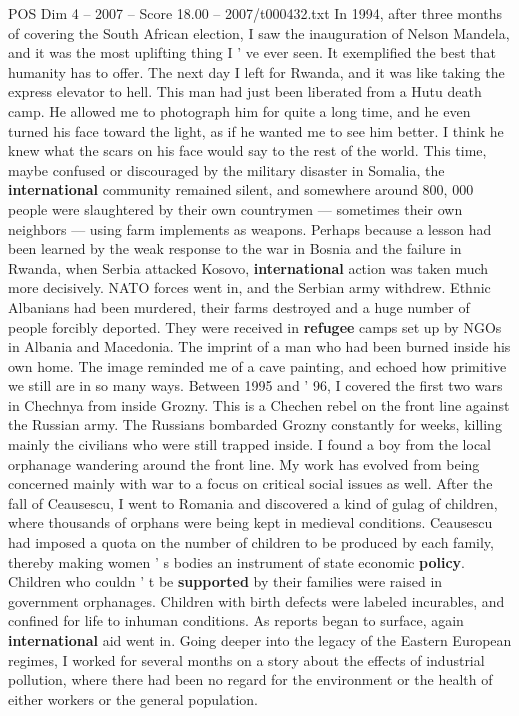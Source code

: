 \begin{textsample}{POS Dim 4 – 2007 – Score 18.00 – 2007/t000432.txt}
In 1994, after three months of covering the South African election, I saw the inauguration of Nelson Mandela, and it was the most uplifting thing I ' ve ever seen.
It exemplified the best that humanity has to offer.
The next day I left for Rwanda, and it was like taking the express elevator to hell.
This man had just been liberated from a Hutu death camp.
He allowed me to photograph him for quite a long time, and he even turned his face toward the light, as if he wanted me to see him better.
I think he knew what the scars on his face would say to the rest of the world.
This time, maybe confused or discouraged by the military disaster in Somalia, the \textbf{international} community remained silent, and somewhere around 800, 000 people were slaughtered by their own countrymen — sometimes their own neighbors — using farm implements as weapons.
Perhaps because a lesson had been learned by the weak response to the war in Bosnia and the failure in Rwanda, when Serbia attacked Kosovo, \textbf{international} action was taken much more decisively.
NATO forces went in, and the Serbian army withdrew.
Ethnic Albanians had been murdered, their farms destroyed and a huge number of people forcibly deported.
They were received in \textbf{refugee} camps set up by NGOs in Albania and Macedonia.
The imprint of a man who had been burned inside his own home.
The image reminded me of a cave painting, and echoed how primitive we still are in so many ways.
Between 1995 and ' 96, I covered the first two wars in Chechnya from inside Grozny.
This is a Chechen rebel on the front line against the Russian army.
The Russians bombarded Grozny constantly for weeks, killing mainly the civilians who were still trapped inside.
I found a boy from the local orphanage wandering around the front line.
My work has evolved from being concerned mainly with war to a focus on critical social issues as well.
After the fall of Ceausescu, I went to Romania and discovered a kind of gulag of children, where thousands of orphans were being kept in medieval conditions.
Ceausescu had imposed a quota on the number of children to be produced by each family, thereby making women ' s bodies an instrument of state economic \textbf{policy}.
Children who couldn ' t be \textbf{supported} by their families were raised in government orphanages.
Children with birth defects were labeled incurables, and confined for life to inhuman conditions.
As reports began to surface, again \textbf{international} aid went in.
Going deeper into the legacy of the Eastern European regimes, I worked for several months on a story about the effects of industrial pollution, where there had been no regard for the environment or the health of either workers or the general population.

\end{textsample}
